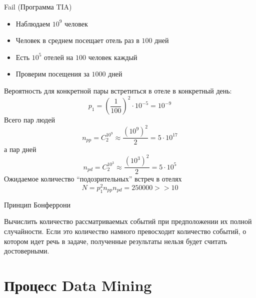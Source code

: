 \documentclass[10pt]{beamer}
\begin{document}
\begin{frame}{Fail (Программа TIA)}

\begin{itemize}
\item Наблюдаем $10^9$ человек
\item Человек в среднем посещает отель раз в $100$ дней
\item Есть $10^5$ отелей на $100$ человек каждый
\item Проверим посещения за $1000$ дней 
\end{itemize}

Вероятность для конкретной пары встретиться в отеле в конкретный день:
\[
p_1 = \left(\frac{1}{100}\right)^2 \cdot 10^{-5} = 10^{-9}
\]
Всего пар людей
\[
n_{pp} = C^{10^9}_2 \approx \frac{(10^9)^2}{2} = 5 \cdot 10^{17}
\]
а пар дней
\[
n_{pd} = C^{10^3}_2 \approx \frac{(10^3)^2}{2} = 5 \cdot 10^{5}
\]
Ожидаемое количество ``подозрительных'' встреч в отелях
\[
N = p_1^2 n_{pp} n_{pd} = 250000 >> 10
\]

\end{frame}

\begin{frame}{Принцип Бонферрони}

Вычислить количество рассматриваемых событий при предположении их полной случайности. Если это количество намного превосходит количество событий, о котором идет речь в задаче, полученные результаты нельзя будет считать достоверными.

\end{frame}

\section{Процесс Data Mining}
\end{document}
